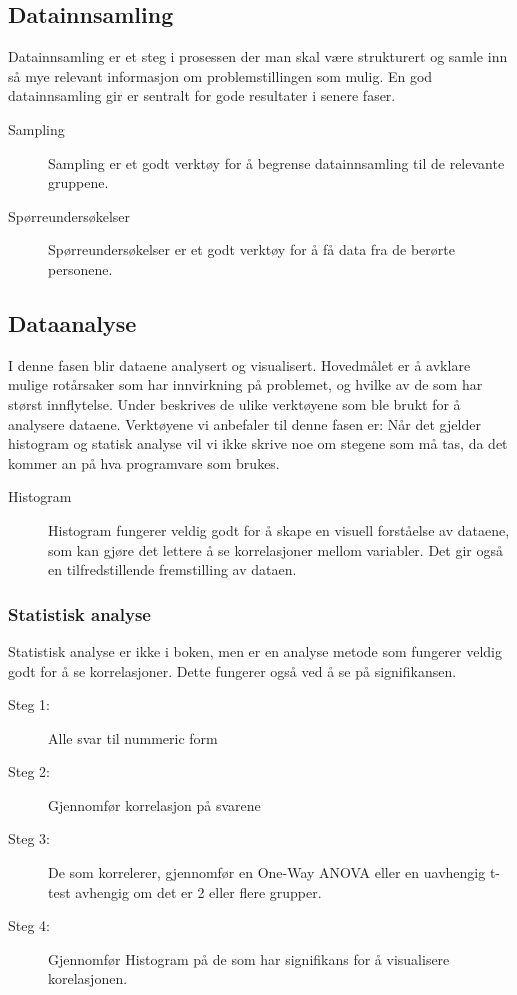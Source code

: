 \subsection{Datainnsamling}
Datainnsamling er et steg i prosessen der man skal være strukturert og samle inn så mye relevant informasjon om problemstillingen som mulig. En god datainnsamling gir er sentralt for gode resultater i senere faser.

\begin{description}
    \item[Sampling] Sampling er et godt verktøy for å begrense datainnsamling til de relevante gruppene. 
    \item[Spørreundersøkelser] Spørreundersøkelser er et godt verktøy for å få data fra de berørte personene. 
\end{description}

\subsection{Dataanalyse}
I denne fasen blir dataene analysert og visualisert. Hovedmålet er å avklare mulige rotårsaker som har innvirkning på problemet, og hvilke av de som har størst innflytelse. Under beskrives de ulike verktøyene som ble brukt for å analysere dataene. Verktøyene vi anbefaler til denne fasen er:
Når det gjelder histogram og statisk analyse vil vi ikke skrive noe om stegene som må tas, da det kommer an på hva programvare som brukes.

\begin{description}
    \item[Histogram] Histogram fungerer veldig godt for å skape en visuell forståelse av dataene, som kan gjøre det lettere å se korrelasjoner mellom variabler. Det gir også en tilfredstillende fremstilling av dataen. 
\end{description}

\subsubsection{Statistisk analyse}
Statistisk analyse er ikke i boken, men er en analyse metode som fungerer veldig godt for å se korrelasjoner. Dette fungerer også ved å se på signifikansen.
\begin{description}
    \item[Steg 1:] Alle svar til nummeric form
    \item[Steg 2:] Gjennomfør korrelasjon på svarene
    \item[Steg 3:] De som korrelerer, gjennomfør en One-Way ANOVA eller en uavhengig t-test avhengig om det er 2 eller flere grupper.
    \item[Steg 4:] Gjennomfør Histogram på de som har signifikans for å visualisere korelasjonen.
\end{description}

